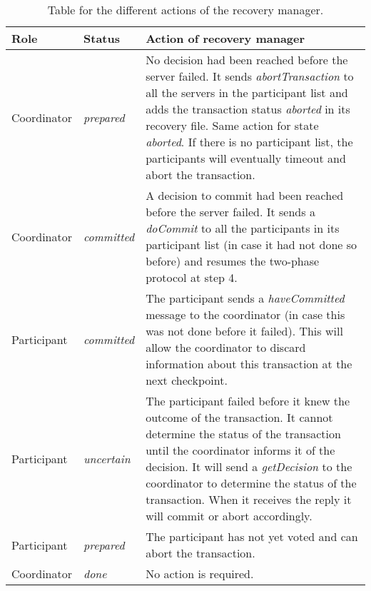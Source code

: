 \begin{table}[H]
	\centering
	\begin{tabular}{| p{2cm} | p{1.8cm} | p{10.8cm} |}
		\hline
		\textbf{Role} & \textbf{Status} & \textbf{Action of recovery manager} \\ \hline
		Coordinator & \textit{prepared} & No decision had been reached before the server failed. It sends \textit{abortTransaction} to all the servers in the participant list and adds the transaction status \textit{aborted} in its recovery file. Same action for state \textit{aborted}. If there is no participant list, the participants will eventually timeout and abort the transaction. \\
		\hline
		Coordinator & \textit{committed} & A decision to commit had been reached before the server failed. It sends a \textit{doCommit} to all the participants in its participant list (in case it had not done so before) and resumes the two-phase protocol at step 4. \\
		\hline
		Participant & \textit{committed} & The participant sends a \textit{haveCommitted} message to the coordinator (in case this was not done before it failed). This will allow the coordinator to discard information about this transaction at the next checkpoint.\\
		\hline
		Participant & \textit{uncertain} & The participant failed before it knew the outcome of the transaction. It cannot determine the status of the transaction until the coordinator informs it of the decision. It will send a \textit{getDecision} to the coordinator to determine the status of the transaction. When it receives the reply it will commit or abort accordingly. \\
		\hline
		Participant & \textit{prepared} & The participant has not yet voted and can abort the transaction. \\
		\hline
		Coordinator & \textit{done} & No action is required. \\
		\hline
	\end{tabular}
	\caption{Table for the different actions of the recovery manager.}
\end{table}